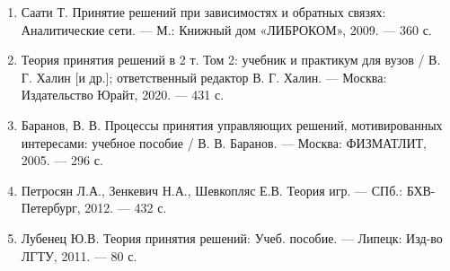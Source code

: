\begin{enumerate}
    \item Саати Т. Принятие решений при зависимостях и обратных связях: Аналитические сети. --- М.: Книжный дом «ЛИБРОКОМ», 2009. --- 360 с.
    \item Теория принятия решений в 2 т. Том 2: учебник и практикум для вузов / В. Г. Халин [и др.]; ответственный редактор В. Г. Халин. --- Москва: Издательство Юрайт, 2020. --- 431 с.
    \item Баранов, В. В. Процессы принятия управляющих решений, мотивированных интересами: учебное пособие / В. В. Баранов. --- Москва: ФИЗМАТЛИТ, 2005. --- 296 с.
    \item Петросян Л.А., Зенкевич Н.А., Шевкопляс Е.В. Теория игр. --- СПб.: БХВ-Петербург, 2012. --- 432 с.
    \item Лубенец Ю.В. Теория принятия решений: Учеб. пособие. --- Липецк: Изд-во ЛГТУ, 2011. --- 80 с.
\end{enumerate}
